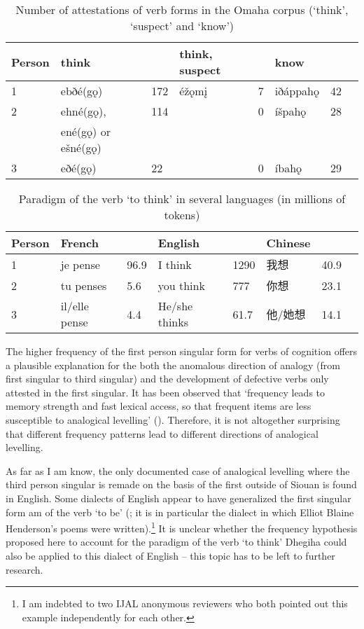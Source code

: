 \documentclass[oneside,a4paper,11pt]{article}
\newcommand{\ipa}[1]{{\phon#1}} %
\newcommand{\zh}[1]{{\cn #1}}
\begin{document}
  \begin{table}[h]
\caption{Number of attestations of verb forms in the Omaha corpus (`think', `suspect' and `know')}  \label{tab:cognition} \centering
\begin{tabular}{l|ll|ll|lll}
\toprule
Person	&think &	&	think, suspect &	&	know &	&	\\
 \midrule
1 & 	\ipa{ebðé(gǫ)}  & 	172 & 	\ipa{éžǫmį} & 	7 & 	\ipa{iðáppahǫ} & 	42 & 	\\
2 & 	\ipa{ehné(gǫ)},  & 	114 & 	 & 	0 & 	\ipa{íšpahǫ} & 	28 & 	\\
& \ipa{ené(gǫ)} or \ipa{ešné(gǫ)} &&&&\\
3 & 	\ipa{eðé(gǫ)} & 	22 & 	 & 	0 & 	\ipa{íbahǫ} & 	29 & 	\\
	\bottomrule			
\end{tabular}
\end{table} 


 \begin{table}[h]
\caption{Paradigm of the verb `to think' in several languages (in millions of tokens)}  \label{tab:cognition2} \centering
\begin{tabular}{l|ll|ll|lll}
\toprule
Person	&French & & English && Chinese && \\
 \midrule
1 & \ipa{je pense} & 96.9 & \ipa{I think}  & 1290 & \zh{我想} &40.9 \\
2 & \ipa{tu penses} & 5.6 & \ipa{you think}  &777& \zh{你想} &23.1 \\
3 &  \ipa{il/elle pense} & 4.4 & \ipa{He/she thinks}  &61.7& \zh{他/她想} &14.1 \\
	\bottomrule			
\end{tabular}
\end{table} 

The higher frequency of the first person singular form for verbs of cognition offers a plausible explanation for the both the anomalous direction of analogy (from first singular to third singular) and the development of defective verbs only attested in the first singular. It has been observed that `frequency leads to memory strength and fast lexical access, so that frequent items are less susceptible to analogical levelling' (\citealt[276]{haspelmath10morpho}). Therefore, it is not altogether surprising that different frequency patterns lead to different directions of analogical levelling.

As far as I am know, the only documented case of analogical levelling where the third person singular is remade on the basis of the first outside of Siouan is found in English. Some dialects of  English appear to have generalized the first singular form \ipa{am} of the verb `to be' (\citealt[163]{dillard75black}; it is in particular the dialect in which Elliot Blaine Henderson's poems were written).\footnote{I am indebted to two IJAL anonymous reviewers who both pointed out this example independently for each other.} It is unclear whether the frequency hypothesis proposed here to account for the paradigm of the verb `to think' Dhegiha could also be applied to this dialect of English -- this topic has to be left to further research.
\end{document}
